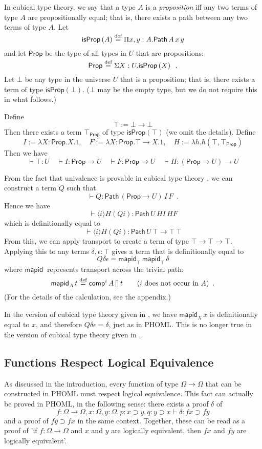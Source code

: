 \documentclass[a4paper,UKenglish]{lipics-v2016}
\newcommand*{\eqdef}{\mathrel{\smash{\stackrel{\text{def}}{=}}}}
\newcommand{\Path}[3]{\ensuremath{\mathsf{Path} \, {#1} \, {#2} \, {#3}}}
\newcommand{\Prop}{\mathsf{Prop}}
\newcommand{\isProp}[1]{\mathsf{isProp} \left( {#1} \right)}
\newcommand{\mapid}[2]{\mathsf{mapid}_{#1} \, {#2}}
\newcommand{\comp}{\mathsf{comp}}
\theoremstyle{plain}
\theoremstyle{definition}
\begin{document}
In cubical type theory, we say that a type $A$ is a \emph{proposition} iff any two terms of type $A$ are propositionally equal; that is, there exists a path between any two terms of type $A$.  Let
\[ \isProp{A} \eqdef \Pi x,y:A. \Path{A}{x}{y} \]
and let $\Prop$ be the type of all types in $U$ that are propositions:
\[ \Prop \eqdef \Sigma X : U. \isProp{X} \enspace . \]
Let $\bot$ be any type in the universe $U$ that is a proposition; that is, there exists a term of type $\isProp{\bot}$.  ($\bot$ may be the empty type, but we do not require this in what follows.)

Define
\[ \top := \bot \rightarrow \bot \]
Then there exists a term $\top_\Prop$ of type $\isProp{\top}$ (we omit the details).  Define
\[ I := \lambda X:\Prop.X.1, \quad F := \lambda X : \Prop.\top \rightarrow X.1, \quad H := \lambda h.h (\top , \top_\Prop) \]
Then we have
\[ \vdash \top : U \quad
\vdash I  : \Prop \rightarrow U \quad
\vdash F  : \Prop \rightarrow U \quad
\vdash H  : (\Prop \rightarrow U) \rightarrow U \]

From the fact that univalence is provable in cubical type theory \cite{cchm:cubical}, we can construct a term $Q$ such that
\[ \vdash Q : \Path{(\Prop \rightarrow U)}{I}{F} \enspace . \]
Hence we have
\[ \vdash \langle i \rangle H (Q i) : \Path{U}{HI}{HF} \]
which is definitionally equal to
\[ \vdash \langle i \rangle H (Q i) : \Path{U}{\top \rightarrow \top}{\top} \]
From this, we can apply transport to create a term of type $\top \rightarrow \top \rightarrow \top$.  Applying this to any terms $\delta, \epsilon : \top$ gives a term that
is definitionally equal to
\[ Q \delta \epsilon = \mapid{\top}{\mapid{\top}{\delta}} \]
where $\mapid{}{}$ represents transport across the trivial path:
\[ \mapid{A}{t} \eqdef \comp^i \, A \, [] \, t \qquad (i \text{ does not occur in } A) \enspace . \]
(For the details of the calculation, see the appendix.)

In the version of cubical type theory given in \cite{bch:cubical}, we have $\mapid{X}{x}$ is definitionally equal to $x$, and therefore $Q \delta \epsilon = \delta$, just as in PHOML.
This is no longer true in the version of cubical type theory given in \cite{cchm:cubical}.

\subsection{Functions Respect Logical Equivalence}
\label{section:exampletwo}

As discussed in the introduction, every function of type $\Omega \rightarrow \Omega$ that can be constructed in PHOML must respect logical equivalence.  This fact can actually be proved in PHOML,
in the following sense: there exists a proof $\delta$ of
\[ f : \Omega \rightarrow \Omega, x : \Omega, y : \Omega, p : x \supset y, q : y \supset x \vdash \delta : f x \supset f y \]
and a proof of $f y \supset f x$ in the same context.  Together, these can be read as a proof of 'if $f : \Omega \rightarrow \Omega$ and $x$ and $y$ are logically equivalent, then $fx$ and $fy$ are logically equivalent'.
\end{document}
